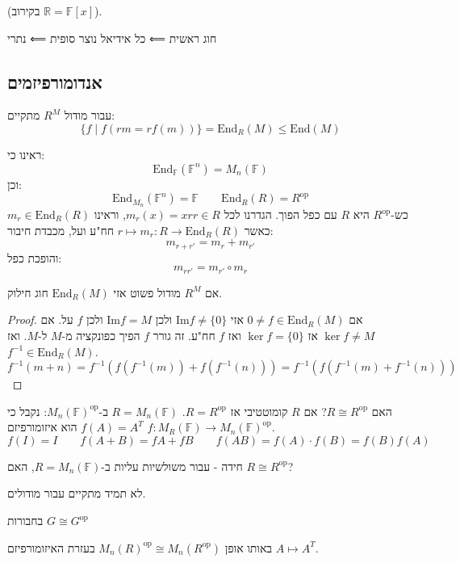 \documentclass{tstextbook}
\begin{document}
(בקירוב \(\mathbb{R}=\mathbb{F}[x]\)).

חוג ראשית ⟸ כל אידיאל נוצר סופית ⟸ נתרי

\subsection{אנדומורפיזמים}

עבור מודול \(R^{M}\) מתקיים:
$$\{ f\mid f(r m=rf(m)) \}=\mathrm{End}_{R}(M)\leq \mathrm{End}(M)$$

\begin{example}
ראינו כי:
$$\mathrm{End}_{\mathbb{F} }(\mathbb{F} ^{n})=M_{n}(\mathbb{F} )$$
וכן:
$$\mathrm{End}_{M_{n}}(\mathbb{F} ^{n})=\mathbb{F} \qquad \mathrm{End}_{R}(R)=R^{\mathrm{op}} $$
כש-\(R^{\text{op}}\) היא \(R\) עם כפל הפוך. הגדרנו לכל \(r \in R\)\(m_{r}(x)=xr\), וראינו \(m_{r} \in \mathrm{End}_{R}(R)\) כאשר \(r \mapsto m_{r}:R\to \mathrm{End}_{R}(R)\) חח"ע ועל, מכבדת חיבור:
$$m_{r+r'}=m_{r}+m_{r'}$$
והופכת כפל:
$$m_{r r'}= m_{r'}\circ m_{r}$$

\end{example}
\begin{proposition}
אם \(R^{M}\) מודול פשוט אזי \(\mathrm{End}_{R}(M)\) חוג חילוק.

\end{proposition}
\begin{proof}
אם \(0\neq f \in \mathrm{End}_{R}(M)\) אזי \(\mathrm{\mathrm{Im}}f\neq \{ 0 \}\) ולכן \(\mathrm{Im} f = M\) ולכן \(f\) על.
אם \(\ker f \neq M\) אז \(\ker f = \{ 0 \}\) ואז \(f\) חח"ע.
זה גורר \(f\) הפיך כפונקציה מ-\(M\) ל-\(M\). ואז \(f ^{-1} \in \mathrm{End}_{R}(M)\).
$$f^{-1} (m+n)=f^{-1} (f(f^{-1} (m))+f(f^{-1} (n)))=f^{-1} (f(f^{-1} (m)+f^{-1} (n)))$$

\end{proof}
האם \(R \cong R^{\text{op}}\)? אם \(R\) קומוטטיבי אז \(R=R^{\mathrm{op}}\). \(R=M_{n}(\mathbb{F})\) ב-\(M_{n}(\mathbb{F})^{\mathrm{op}}\):
נקבל כי \(f(A)=A^{T}\) הוא איזומורפיזם \(f:M_{R}(\mathbb{F})\to M_{n}(\mathbb{F})^{\mathrm{op}}\).
$$f(I)=I\qquad f(A+B)=fA+fB\qquad f(AB)=f(A)\cdot f(B)=f(B)f(A)$$

חידה - עבור משולשיות עליות ב-\(R=M_{n}(\mathbb{F})\), האם \(R\cong R^{\mathrm{op}}\)?

לא תמיד מתקיים עבור מודולים.

בחבורות \(G\cong G^{\text{op}}\)

באותו אופן \(M_{n}(R)^{\text{op}}\cong M_{n}(R^{\text{op}})\) בעזרת האיזומורפיזם \(A\mapsto A^{T}\).
\end{document}
